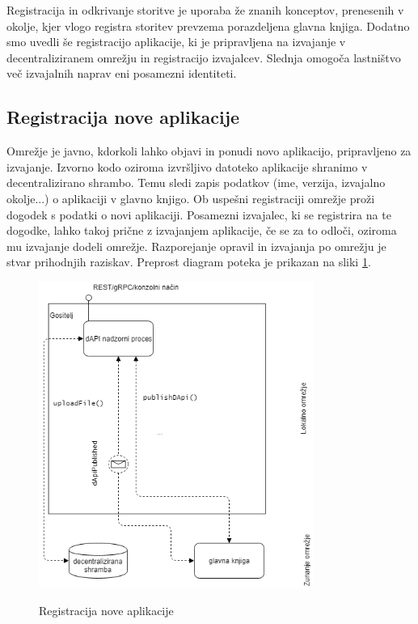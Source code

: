 \documentclass[a4paper, 12pt]{book}
\begin{document}
Registracija in odkrivanje storitve je uporaba že znanih konceptov, prenesenih v okolje, kjer vlogo registra storitev prevzema porazdeljena glavna knjiga.
Dodatno smo uvedli še registracijo aplikacije, ki je pripravljena na izvajanje v decentraliziranem omrežju in registracijo izvajalcev.
Slednja omogoča lastništvo več izvajalnih naprav eni posamezni identiteti.


\subsection{Registracija nove aplikacije}
\label{registerService}

Omrežje je javno, kdorkoli lahko objavi in ponudi novo aplikacijo, pripravljeno za izvajanje.
Izvorno kodo oziroma izvršljivo datoteko aplikacije shranimo v decentralizirano shrambo.
Temu sledi zapis podatkov (ime, verzija, izvajalno okolje...) o aplikaciji v glavno knjigo.
Ob uspešni registraciji omrežje proži dogodek s podatki o novi aplikaciji.
Posamezni izvajalec, ki se registrira na te dogodke, lahko takoj prične z izvajanjem aplikacije, če se za to odloči, oziroma mu izvajanje dodeli omrežje.
Razporejanje opravil in izvajanja po omrežju je stvar prihodnjih raziskav.
Preprost diagram poteka je prikazan na sliki \ref{register_api}.

\begin{figure}[h]
	\centering
	\includegraphics[width=0.8\textwidth]{slike/register_api.png}
	\label{register_api}
	\caption{Registracija nove aplikacije}
\end{figure}
\end{document}
